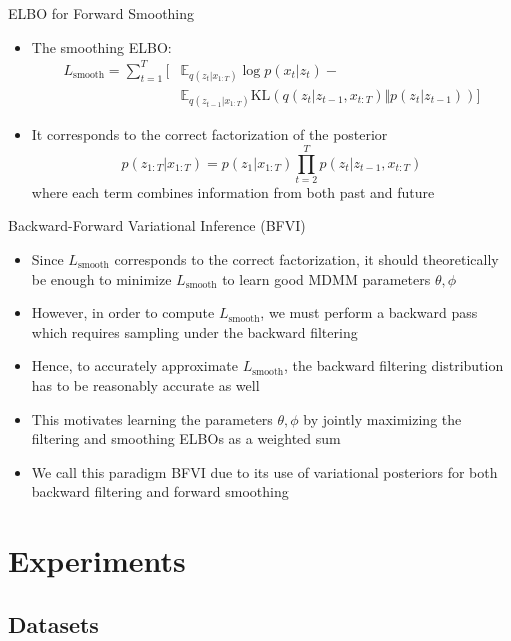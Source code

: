 \documentclass{beamer}
\begin{document}
\begin{frame}{ELBO for Forward Smoothing}
\begin{itemize}
\item The smoothing ELBO:\[
\begin{split}
L_\text{smooth}=\sum_{t=1}^T[&\mathbb{E}_{q(z_t|x_{1:T})}\log p(x_t|z_t)-\\
&\mathbb{E}_{q(z_{t-1}|x_{1:T})}\text{KL}(q(z_t|z_{t-1},x_{t:T})\Vert p(z_t|z_{t-1}))]
\end{split}
\]
\item It corresponds to the correct factorization of the posterior\[
p(z_{1:T}|x_{1:T})=p(z_1|x_{1:T})\prod_{t=2}^T p(z_t|z_{t-1},x_{t:T})
\]where each term combines information from both past and future
\end{itemize}
\end{frame}

\begin{frame}{Backward-Forward Variational Inference (BFVI)}
\begin{itemize}
\item Since $L_\text{smooth}$ corresponds to the correct factorization, it should theoretically be enough to minimize $L_\text{smooth}$ to learn good MDMM parameters $\theta,\phi$
\item However, in order to compute $L_\text{smooth}$, we must perform a backward pass which requires sampling under the backward filtering
\item Hence, to accurately approximate $L_\text{smooth}$, the backward filtering distribution has to be reasonably accurate as well
\item This motivates learning the parameters $\theta,\phi$ by jointly maximizing the filtering and smoothing ELBOs as a weighted sum
\item We call this paradigm BFVI due to its use of variational posteriors for both backward filtering and forward smoothing
\end{itemize}
\end{frame}

\section{Experiments}
\subsection{Datasets}
\end{document}
